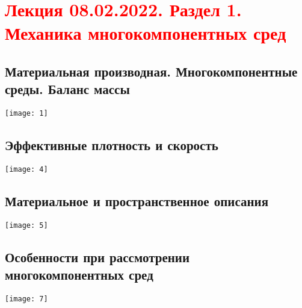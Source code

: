 \documentclass[main.tex]{subfiles}
\begin{document}
\section{\textcolor{red}{Лекция 08.02.2022. Раздел 1. Механика многокомпонентных сред}}

\subsection{Материальная производная. Многокомпонентные среды. Баланс массы}
\texttt{[image: 1]}




\subsection{Эффективные плотность и скорость}
\texttt{[image: 4]}


\subsection{Материальное и пространственное описания}
\texttt{[image: 5]}


\subsection{Особенности при рассмотрении многокомпонентных сред}
\texttt{[image: 7]}
\end{document}
